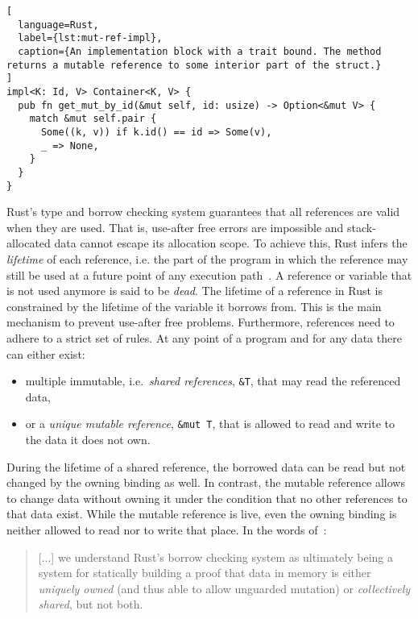 \begin{lstlisting}[
  language=Rust,
  label={lst:mut-ref-impl},
  caption={An implementation block with a trait bound. The method returns a mutable reference to some interior part of the struct.}
]
impl<K: Id, V> Container<K, V> {
  pub fn get_mut_by_id(&mut self, id: usize) -> Option<&mut V> {
    match &mut self.pair {
      Some((k, v)) if k.id() == id => Some(v),
      _ => None,
    }
  }
}
\end{lstlisting}

Rust's type and borrow checking system guarantees that all references are valid
when they are used. That is, use-after free errors are impossible and
stack-allocated data cannot escape its allocation scope. To achieve this, Rust
infers the \emph{lifetime} of each reference, i.e. the part of the program in
which the reference may still be used at a future point of any execution
path~\cite{wiki:live-vars}. A reference or variable that is not used anymore is
said to be \emph{dead}. The lifetime of a reference in Rust is constrained by
the lifetime of the variable it borrows from. This is the main  mechanism to
prevent use-after free problems. Furthermore, references need to adhere to a
strict set of rules. At any point of a program and for any data there can either
exist:


\begin{itemize}
\tightlist
\item multiple immutable, i.e.~\emph{shared references}, \lstinline!&T!,  that
may read the referenced data,

\item or a \emph{unique mutable reference}, \passthrough{\lstinline!&mut T!},
that is allowed to read and write to the data it does not own.
\end{itemize}

During the lifetime of a shared reference, the borrowed data can be read but not
changed by the owning binding as well. In contrast, the mutable reference allows
to change data without owning it under the condition that no other references to
that data exist. While the mutable reference is live, even the owning binding is
neither allowed to read nor to write that place. In the words of~\citet{oxide}:

\begin{quote}
{[...]} we understand Rust's borrow checking system as ultimately being a system
for statically building a proof that data in memory is either
\emph{uniquely owned} (and thus able to allow unguarded mutation) or
\emph{collectively shared}, but not both.
\end{quote}

